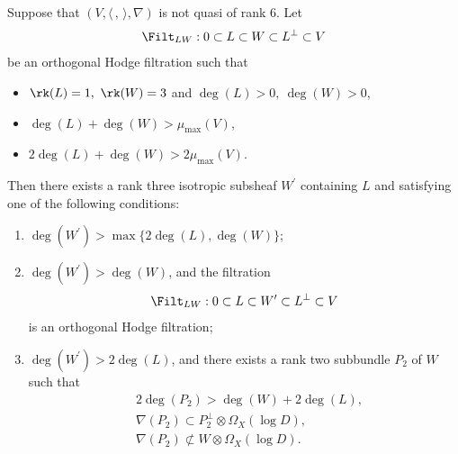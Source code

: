 \begin{lem}\label{degreeincreasing}
Suppose that $(V,\langle \,, \, \rangle,\nabla)$ is not quasi \grsemistable of rank $6$. Let
\[
\Filt_{LW}:0\subset L\subset W\subset L^\perp\subset V
\]
be an orthogonal Hodge filtration such that
\begin{itemize}
\item $\rk(L)=1, \ \rk(W)=3$ and $\deg(L)>0, \ \deg(W)>0$,
\item $\deg(L)+\deg(W)>\mu_{\max}(V)$,
\item $2\deg(L)+\deg(W)>2\mu_{\max}(V)$.
\end{itemize}
Then there exists a rank three isotropic subsheaf $W^\prime$ containing $L$ and satisfying one of the following conditions:
\begin{enumerate}
\item $\deg(W^\prime)>\max\{2\deg(L),\deg(W)\}$;
\item $\deg(W^\prime)>\deg(W)$, and the filtration
\[
\Filt_{LW}:0\subset L\subset W^\prime\subset L^\perp\subset V
\]
is an orthogonal Hodge filtration;
\item $\deg(W^\prime)>2\deg(L)$, and there exists a rank two subbundle $P_2$ of $W$ such that
\begin{align*}
& 2\deg(P_2)>\deg(W)+2\deg(L), \\
& \nabla(P_2)\subset P_2^\perp\otimes\Omega_X(\log D), \\ & \nabla(P_2)\not\subset W\otimes\Omega_X(\log D).
\end{align*}
\end{enumerate}
\end{lem}
